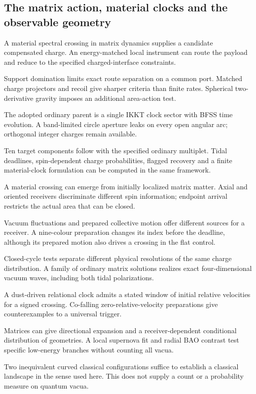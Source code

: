 \subsection{The matrix action, material clocks and the observable geometry}
\begin{description}\small
\setlength{\itemsep}{.25em}\setlength{\parskip}{0pt}
\item[\textnormal{\texttt{RES-0142}}] A material spectral crossing in matrix dynamics supplies a candidate compensated charge. An energy-matched local instrument can route the payload and reduce to the specified charged-interface constraints.
\item[\textnormal{\texttt{RES-0143}}] Support domination limits exact route separation on a common port. Matched charge projectors and recoil give sharper criteria than finite rates. Spherical two-derivative gravity imposes an additional area-action test.
\item[\textnormal{\texttt{RES-0144}}] The adopted ordinary parent is a single IKKT clock sector with BFSS time evolution. A band-limited circle aperture leaks on every open angular arc; orthogonal integer charges remain available.
\item[\textnormal{\texttt{RES-0145}}] Ten target components follow with the specified ordinary multiplet. Tidal deadlines, spin-dependent charge probabilities, flagged recovery and a finite material-clock formulation can be computed in the same framework.
\item[\textnormal{\texttt{RES-0146}}] A material crossing can emerge from initially localized matrix matter. Axial and oriented receivers discriminate different spin information; endpoint arrival restricts the actual area that can be closed.
\item[\textnormal{\texttt{RES-0147}}] Vacuum fluctuations and prepared collective motion offer different sources for a receiver. A nine-colour preparation changes its index before the deadline, although its prepared motion also drives a crossing in the flat control.
\item[\textnormal{\texttt{RES-0148}}] Closed-cycle tests separate different physical resolutions of the same charge distribution. A family of ordinary matrix solutions realizes exact four-dimensional vacuum waves, including both tidal polarizations.
\item[\textnormal{\texttt{RES-0149}}] A dust-driven relational clock admits a stated window of initial relative velocities for a signed crossing. Co-falling zero-relative-velocity preparations give counterexamples to a universal trigger.
\item[\textnormal{\texttt{RES-0150}}] Matrices can give directional expansion and a receiver-dependent conditional distribution of geometries. A local supernova fit and radial BAO contrast test specific low-energy branches without counting all vacua.
\item[\textnormal{\texttt{RES-0151}}] Two inequivalent curved classical configurations suffice to establish a classical landscape in the sense used here. This does not supply a count or a probability measure on quantum vacua.
\end{description}

